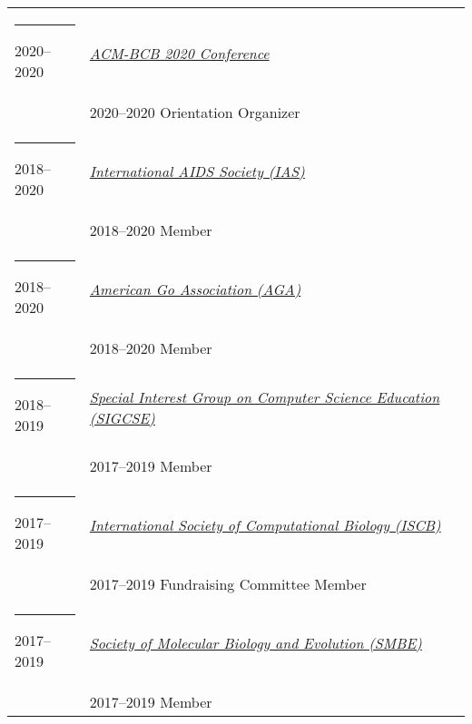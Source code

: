 \documentclass[margin,line]{res}
\begin{document}
\begin{resume}
\begin{longtable}{@{}p{0.7in}p{4in}}
\hspace*{-4mm} \rule{-1mm}{5mm} 2020--2020 & \href{https://acm-bcb.org/2020}{\textit{ACM-BCB 2020 Conference}}\\*
\hspace*{-4mm} & \hspace{4mm} 2020--2020 Orientation Organizer\\
\hspace*{-4mm} \rule{-1mm}{5mm} 2018--2020 & \href{https://www.iasociety.org/}{\textit{International AIDS Society (IAS)}}\\*
\hspace*{-4mm} & \hspace{4mm} 2018--2020 Member\\
\hspace*{-4mm} \rule{-1mm}{5mm} 2018--2020 & \href{http://www.usgo.org/}{\textit{American Go Association (AGA)}}\\*
\hspace*{-4mm} & \hspace{4mm} 2018--2020 Member\\
\hspace*{-4mm} \rule{-1mm}{5mm} 2018--2019 & \href{https://sigcse.org/}{\textit{Special Interest Group on Computer Science Education (SIGCSE)}}\\*
\hspace*{-4mm} & \hspace{4mm} 2017--2019 Member\\
\hspace*{-4mm} \rule{-1mm}{5mm} 2017--2019 & \href{https://www.iscb.org/}{\textit{International Society of Computational Biology (ISCB)}}\\*
\hspace*{-4mm} & \hspace{4mm} 2017--2019 Fundraising Committee Member\\
\hspace*{-4mm} \rule{-1mm}{5mm} 2017--2019 & \href{http://www.smbe.org/}{\textit{Society of Molecular Biology and Evolution (SMBE)}}\\*
\hspace*{-4mm} & \hspace{4mm} 2017--2019 Member\\
\end{longtable}


\end{resume}
\end{document}
